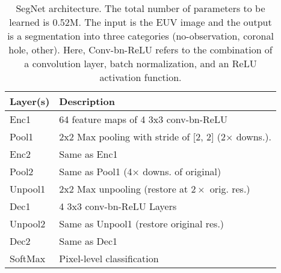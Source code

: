 \begin{table}[b!]
	\centering	
	\caption{\color{blue}
		SegNet architecture.
		The total number of parameters to be learned 
		is 0.52M.
		The input is the EUV image and the output is
		a segmentation into three categories
		(no-observation, coronal hole, other).   	       
		Here, Conv-bn-ReLU refers to the combination
		of a convolution layer, batch normalization, and an ReLU
		activation function.
	}
	\label{tab:segnet_arch}
	\color{blue}
	\begin{tabular}{p{1cm} p{6.5cm}}
		\toprule
		\textbf{Layer(s)} & \textbf{Description}\\
		\midrule
		Enc1	&   64 feature maps of 4 3x3 conv-bn-ReLU 	\\
		Pool1	&	2x2 Max pooling with stride of [2, 2] 
		(2$\times$ downs.).	\\
		Enc2	&	Same as Enc1	\\
		Pool2	&	Same as Pool1 (4$\times$ downs. of original) \\
		Unpool1	&	2x2 Max unpooling (restore at $2\times$ orig. res.)	\\
		Dec1	&	4 3x3 conv-bn-ReLU Layers	\\
		Unpool2	&	Same as Unpool1	(restore original res.) \\
		Dec2	&	Same as Dec1	\\
		SoftMax	&	Pixel-level classification	\\
		\bottomrule
	\end{tabular}
\end{table}
\color{black}